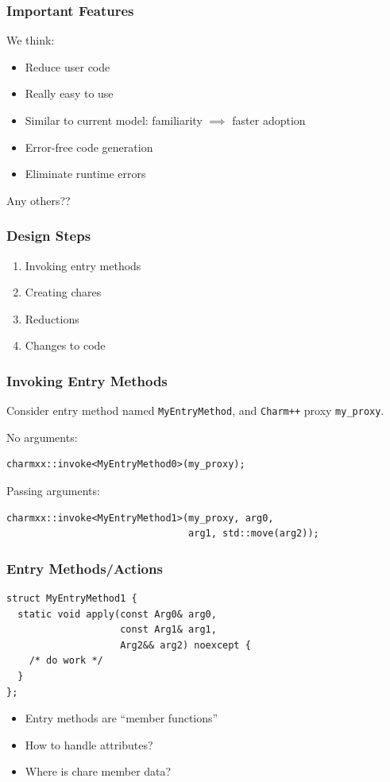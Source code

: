 \documentclass[svgnames,tikz,serif,ragged2e]{beamer}
\newcommand{\orgspace}[0]{
  \vspace{0.3cm}
}
\begin{document}
\begin{frame}
  \frametitle{Important Features}
  We think:
  \begin{itemize}
  \item Reduce user code
  \item Really easy to use
  \item Similar to current model: familiarity $\implies$ faster adoption
  \item Error-free code generation
  \item Eliminate runtime errors
  \end{itemize}

  Any others??
\end{frame}

\begin{frame}
  \frametitle{Design Steps}
  \begin{enumerate}
  \item Invoking entry methods
  \item Creating chares
  \item Reductions
  \item Changes to code
  \end{enumerate}
\end{frame}

\begin{frame}[fragile]
  \frametitle{Invoking Entry Methods}
  Consider entry method named \texttt{MyEntryMethod}, and \texttt{Charm++} proxy
  \texttt{my\_proxy}.
  \orgspace{}

No arguments:
\begin{lstlisting}
charmxx::invoke<MyEntryMethod0>(my_proxy);
\end{lstlisting}

\orgspace{}
Passing arguments:
\begin{lstlisting}
charmxx::invoke<MyEntryMethod1>(my_proxy, arg0,
                                arg1, std::move(arg2));
\end{lstlisting}
\end{frame}

\begin{frame}[fragile]
  \frametitle{Entry Methods/Actions}
\begin{lstlisting}
struct MyEntryMethod1 {
  static void apply(const Arg0& arg0,
                    const Arg1& arg1,
                    Arg2&& arg2) noexcept {
    /* do work */
  }
};
\end{lstlisting}

  \begin{itemize}
  \item Entry methods are ``member functions''
  \item How to handle attributes?
  \item Where is chare member data?
  \end{itemize}
\end{frame}
\end{document}
